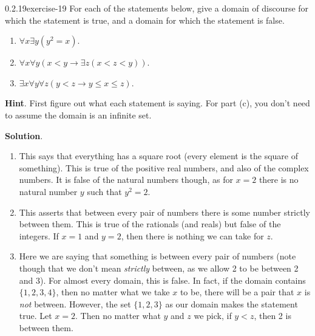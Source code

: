 \documentclass[twoside,11pt,]{book}
\numberwithin{equation}{chapter}
\newcommand{\imp}{\rightarrow}
\newcommand{\lt}{<}
\begin{document}
\begin{divisionsolution}{0.2.19}{}{exercise-19}%
\hypertarget{p-393}{}%
For each of the statements below, give a domain of discourse for which the statement is true, and a domain for which the statement is false.\leavevmode%
\begin{enumerate}[label=(\alph*)]
\item\hypertarget{li-427}{}\(\forall x \exists y (y^2 = x)\).%
\item\hypertarget{li-428}{}\(\forall x \forall y (x \lt y \imp \exists z (x \lt z \lt y))\).%
\item\hypertarget{li-429}{}\(\exists x \forall y \forall z (y \lt z \imp y \le x \le z)\).%
\end{enumerate}
%
\par\smallskip%
\noindent\textbf{Hint}.\quad%
\hypertarget{p-394}{}%
First figure out what each statement is saying.  For part (c), you don't need to assume the domain is an infinite set.%
\par\smallskip%
\noindent\textbf{Solution}.\quad%
\hypertarget{p-395}{}%
\leavevmode%
\begin{enumerate}[label=(\alph*)]
\item\hypertarget{li-430}{}\hypertarget{p-396}{}%
This says that everything has a square root (every element is the square of something). This is true of the positive real numbers, and also of the complex numbers. It is false of the natural numbers though, as for \(x = 2\) there is no natural number \(y\) such that \(y^2 = 2\).%
\item\hypertarget{li-431}{}\hypertarget{p-397}{}%
This asserts that between every pair of numbers there is some number strictly between them. This is true of the rationals (and reals) but false of the integers. If \(x = 1\) and \(y = 2\), then there is nothing we can take for \(z\).%
\item\hypertarget{li-432}{}\hypertarget{p-398}{}%
Here we are saying that something is between every pair of numbers (note though that we don't mean \emph{strictly} between, as we allow 2 to be between 2 and 3). For almost every domain, this is false. In fact, if the domain contains \(\{1,2,3, 4\}\), then no matter what we take \(x\) to be, there will be a pair that \(x\) is \emph{not} between. However, the set \(\{1,2,3\}\) as our domain makes the statement true. Let \(x = 2\). Then no matter what \(y\) and \(z\) we pick, if \(y \lt z\), then 2 is between them.%
\end{enumerate}
%
\end{divisionsolution}%
\end{document}
